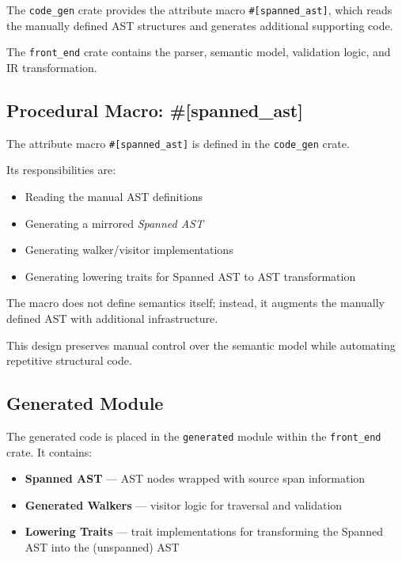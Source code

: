 \documentclass[a4paper,11pt]{article}
\begin{document}
The \texttt{code\_gen} crate provides the attribute macro
\texttt{\#[spanned\_ast]}, which reads the manually defined AST
structures and generates additional supporting code.

The \texttt{front\_end} crate contains the parser, semantic model,
validation logic, and IR transformation.

\subsection{Procedural Macro: \#[spanned\_ast]}

The attribute macro \texttt{\#[spanned\_ast]} is defined in the
\texttt{code\_gen} crate.

Its responsibilities are:

\begin{itemize}
    \item Reading the manual AST definitions
    \item Generating a mirrored \emph{Spanned AST}
    \item Generating walker/visitor implementations
    \item Generating lowering traits for Spanned AST to AST transformation
\end{itemize}

The macro does not define semantics itself; instead, it augments
the manually defined AST with additional infrastructure.

This design preserves manual control over the semantic model
while automating repetitive structural code.

\subsection{Generated Module}

The generated code is placed in the \texttt{generated} module
within the \texttt{front\_end} crate. It contains:

\begin{itemize}
    \item \textbf{Spanned AST} — AST nodes wrapped with source span information
    \item \textbf{Generated Walkers} — visitor logic for traversal and validation
    \item \textbf{Lowering Traits} — trait implementations for transforming
          the Spanned AST into the (unspanned) AST
\end{itemize}
\end{document}
